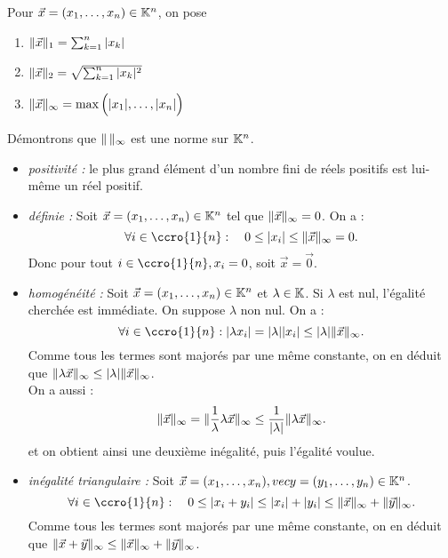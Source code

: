 \documentclass{book}
\begin{document}
\begin{Exemple}
Pour $\vec{x} =(x_1,\dots,x_n)\in \mathbb{K}^n$, on pose
\begin{enumerate}
\item $\mathopen\lVert \vec{x} \mathclose\rVert_1 = \sum_{k=1}^n |x_k|$
\item $\mathopen\lVert \vec{x} \mathclose\rVert_2 = \sqrt{\sum_{k=1}^n |x_k|^2}$
\item $\mathopen\lVert \vec{x} \mathclose\rVert_\infty = \max\Big(|x_1|,\dots,|x_n|\Big)$
\end{enumerate}
Démontrons que $\mathopen\lVert \, \mathclose\rVert_\infty$ est une norme sur $\mathbb{K}^n$. \\
\begin{itemize}
\item \textit{positivité :} le plus grand élément d'un nombre fini de réels positifs est lui-même un réel positif. 
\item \textit{définie :} Soit $\vec{x}=(x_1,\dots,x_n)\in \mathbb{K}^n$ tel que $\mathopen\lVert \vec{x} \mathclose\rVert_\infty=0$. On a :
 $$\forall i\in \ccro{1}{n} :\quad  0\leq |x_i|\leq \norme{\vec{x}}_\infty=0.$$ Donc pour tout $i\in\ccro{1}{n},x_i=0$, soit  $\vec{x}=\vec{0}$.
\item \textit{homogénéité :} Soit $\vec{x}=(x_1,\dots,x_n)\in \mathbb{K}^n$ et $\lambda\in\mathbb{K}$.  Si $\lambda$ est nul, l'égalité cherchée est immédiate. On suppose $\lambda$ non nul.
On a :
$$\forall i\in \ccro{1}{n} : |\lambda x_i| = |\lambda| |x_i|\leq |\lambda| \norme{\vec{x}}_\infty.$$ Comme tous les termes sont majorés par une même constante, on en déduit que  $  \mathopen\lVert \lambda\vec{x} \mathclose\rVert_\infty \leq |\lambda| \mathopen\lVert \vec{x} \mathclose\rVert_\infty$.\\
On a aussi :
$$\mathopen\lVert \vec{x} \mathclose\rVert_\infty=\mathopen\lVert \frac{1}{\lambda}\lambda\vec{x} \mathclose\rVert_\infty\leq \frac{1}{|\lambda|} \mathopen\lVert \lambda\vec{x} \mathclose\rVert_\infty.$$
 et on obtient ainsi une deuxième inégalité, puis l'égalité voulue. 
\item \textit{inégalité triangulaire :} Soit $\vec{x}=(x_1,\dots,x_n),vec{y}=(y_1,\dots,y_n)\in \mathbb{K}^n$.
$$\forall i\in \ccro{1}{n} :\quad  0\leq |x_i+y_i|\leq |x_i|+|y_i|\leq \norme{\vec{x}}_\infty +\norme{\vec{y}}_\infty .$$ Comme tous les termes sont majorés par une même constante, on en déduit que  $  \mathopen\lVert \vec{x}+\vec{y} \mathclose\rVert_\infty \leq  \mathopen\lVert \vec{x} \mathclose\rVert_\infty+\mathopen\lVert \vec{y} \mathclose\rVert_\infty$.
\end{itemize}  

\end{Exemple}
\end{document}
